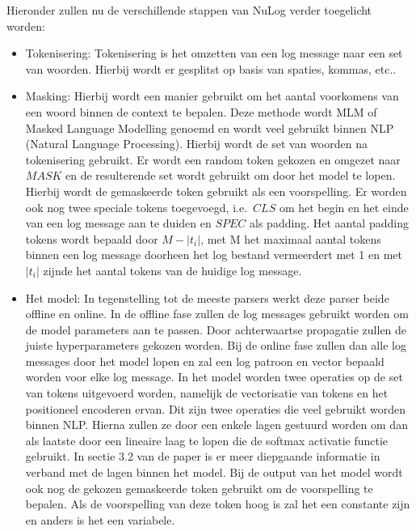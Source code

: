 Hieronder zullen nu de verschillende stappen van NuLog verder toegelicht worden:
\begin{itemize}
    \item Tokenisering: Tokenisering is het omzetten van een log message naar een set van woorden. Hierbij wordt er gesplitst op basis van spaties, kommas, etc..\\
    
    \item Masking: Hierbij wordt een manier gebruikt om het aantal voorkomens van een woord binnen de context te bepalen. Deze methode wordt MLM of Masked Language Modelling genoemd en wordt veel gebruikt binnen NLP (Natural Language Processing). Hierbij wordt de set van woorden na tokenisering gebruikt. Er wordt een random token gekozen en omgezet naar $MASK$ en de resulterende set wordt gebruikt om door het model te lopen. Hierbij wordt de gemaskeerde token gebruikt als een voorspelling. Er worden ook nog twee speciale tokens toegevoegd, i.e.\ $CLS$ om het begin en het einde van een log message aan te duiden en $SPEC$ als padding. Het aantal padding tokens wordt bepaald door $M-\lvert t_{i} \rvert$, met M het maximaal aantal tokens binnen een log message doorheen het log bestand vermeerdert met 1 en met $\lvert t_{i} \rvert$ zijnde het aantal tokens van de huidige log message.\\
    
    \item Het model: In tegenstelling tot de meeste parsers werkt deze parser beide offline en online. In de offline fase zullen de log messages gebruikt worden om de model parameters aan te passen. Door achterwaartse propagatie zullen de juiste hyperparameters gekozen worden. Bij de online fase zullen dan alle log messages door het model lopen en zal een log patroon en vector bepaald worden voor elke log message. In het model worden twee operaties op de set van tokens uitgevoerd worden, namelijk de vectorisatie van tokens en het positioneel encoderen ervan. Dit zijn twee operaties die veel gebruikt worden binnen NLP. Hierna zullen ze door een enkele lagen gestuurd worden om dan als laatste door een lineaire laag te lopen die de softmax activatie functie gebruikt. In sectie 3.2 van de paper is er meer diepgaande informatie in verband met de lagen binnen het model. Bij de output van het model wordt ook nog de gekozen gemaskeerde token gebruikt om de voorspelling te bepalen. Als de voorspelling van deze token hoog is zal het een constante zijn en anders is het een variabele.
\end{itemize}

